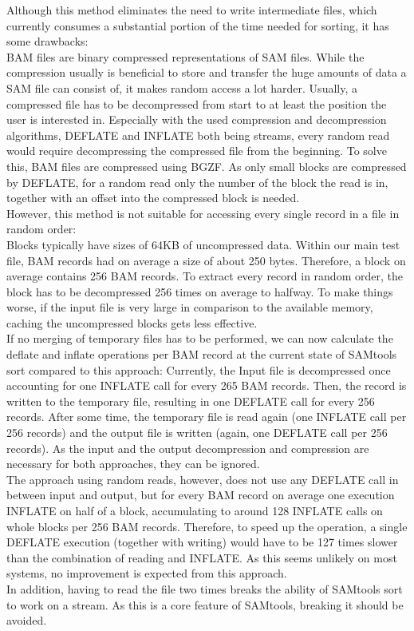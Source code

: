 Although this method eliminates the need to write intermediate files, which currently consumes a substantial portion of the time needed for sorting, it has some drawbacks: \\
BAM files are binary compressed representations of SAM files. While the compression usually is beneficial to store and transfer the huge amounts of data a SAM file can consist of, it makes random access a lot harder. Usually, a compressed file has to be decompressed from start to at least the position the user is interested in. Especially with the used compression and decompression algorithms, DEFLATE and INFLATE both being streams, every random read would require decompressing the compressed file from the beginning. To solve this, BAM files are compressed using BGZF. As only small blocks are compressed by DEFLATE, for a random read only the number of the block the read is in, together with an offset into the compressed block is needed. \\
However, this method is not suitable for accessing every single record in a file in random order: \\
Blocks typically have sizes of 64KB of uncompressed data. Within our main test file, BAM records had on average a size of about 250 bytes. Therefore, a block on average contains 256 BAM records. To extract every record in random order, the block has to be decompressed 256 times on average to halfway. To make things worse, if the input file is very large in comparison to the available memory, caching  the uncompressed blocks gets less effective. \\
If no merging of temporary files has to be performed, we can now calculate the deflate and inflate operations per BAM record at the current state of SAMtools sort compared to this approach: Currently, the Input file is decompressed once accounting for one INFLATE call for every 265 BAM records. Then, the record is written to the temporary file, resulting in one DEFLATE call for every 256 records. After some time, the temporary file is read again (one INFLATE call per 256 records) and the output file is written (again, one DEFLATE call per 256 records). As the input and the output decompression and compression are necessary for both approaches, they can be ignored. \\
The approach using random reads, however, does not use any DEFLATE call in between input and output, but for every BAM record on average one execution INFLATE on half of a block, accumulating to around 128 INFLATE calls on whole blocks per 256 BAM records. Therefore, to speed up the operation, a single DEFLATE execution (together with writing) would have to be 127 times slower than the combination of reading and INFLATE. As this seems unlikely on most systems, no improvement is expected from this approach. \\
In addition, having to read the file two times breaks the ability of SAMtools sort to work on a stream. As this is a core feature of SAMtools, breaking it should be avoided.


